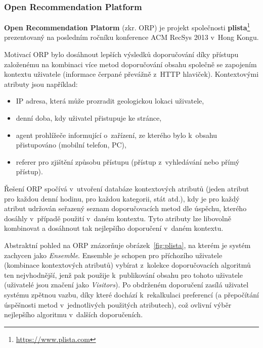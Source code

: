 \documentclass[thesis=M,czech]{FITthesis}[2014/05/07]
\begin{document}
\subsubsection{Open Recommendation Platform}
\label{sub:orp}
\textbf{Open Recommendation Platorm} (zkr. ORP) je projekt společnosti \textbf{plista}\footnote{\url{https://www.plista.com}} prezentovaný na posledním ročníku konference ACM RecSys 2013 v~Hong Kongu. 

Motivací ORP bylo dosáhnout lepších výsledků doporučování díky přístupu založenému na kombinaci více metod doporučování obsahu společně se zapojením kontextu uživatele (informace čerpané převážně z~HTTP hlaviček). Kontextovými atributy jsou například:

\begin{itemize}
	\item IP adresa, která může prozradit geologickou lokaci uživatele,
	\item denní doba, kdy uživatel přistupuje ke stránce,
	\item agent prohlížeče informující o~zařízení, ze kterého bylo k~obsahu přistupováno (mobilní telefon, PC),
	\item referer pro zjištění způsobu přístupu (přístup z~vyhledávání nebo přímý přístup). 
\end{itemize}

Řešení ORP spočívá v~utvoření databáze kontextových atributů (jeden atribut pro každou denní hodinu, pro každou kategorii, stát atd.), kdy je pro každý atribut udržován seřazený seznam doporučovacích metod dle úspěchu, kterého dosáhly v~případě použití v~daném kontextu. Tyto atributy lze libovolně kombinovat a dosáhnout tak nejlepšího doporučení v~daném kontextu.

Abstraktní pohled na ORP znázorňuje obrázek~\ref{fig:plista}, na kterém je systém zachycen jako \emph{Ensemble}. Ensemble je schopen pro příchozího uživatele (kombinace kontextových atributů) vybírat z~kolekce doporučovacích algoritmů ten nejvhodnější, jenž pak použije k~publikování obsahu pro tohoto uživatele (uživatelé jsou značení jako \emph{Visitors}). Po obdrženém doporučení zasílá uživatel systému zpětnou vazbu, díky které dochází k~rekalkulaci preferencí (a přepočítání úspěšnosti metod v~jednotlivých použitých atributech), což ovlivní výběr nejlepšího algoritmu v~dalších doporučeních.
\end{document}
